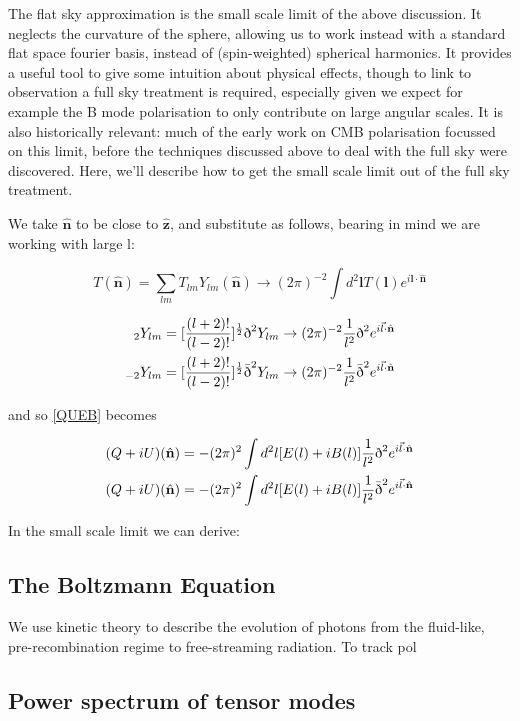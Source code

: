 \documentclass[a4paper,11pt]{article}
\renewcommand{\v}[1]{\mathbf{#1}}
\newcommand{\half}{\frac{1}{2}}
\newcommand{\unit}[1]{\hat{\v{#1}}}
\newcommand{\sr}{\text{\normalfont\dh}}
\renewcommand{\sl}{\bar{\text{\normalfont\dh}}}
\newcommand{\ltwo}{[\frac{(l+2)!}{(l-2)!}]}
\begin{document}
The flat sky approximation is the small scale limit of the above discussion. It neglects the curvature of the sphere, allowing us to work instead with a standard flat space fourier basis, instead of (spin-weighted) spherical harmonics. It provides a useful tool to give some intuition about physical effects, though to link to observation a full sky treatment is required, especially given we expect for example the B mode polarisation to only contribute on large angular scales. It is also historically relevant: much of the early work on CMB polarisation focussed on this limit, before the techniques discussed above to deal with the full sky were discovered. Here, we'll describe how to get the small scale limit out of the full sky treatment.

We take $\unit{n}$ to be close to $\unit{z}$, and substitute as follows, bearing in mind we are working with large l:

\begin{equation}
T(\unit{n}) = \sum_{lm} T_{lm}Y_{lm}(\unit{n}) \rightarrow (2\pi)^{-2} \int d^2\v{l} T(\v{l})e^{i\v{l}\cdot\unit{n}}
\end{equation}

\begin{align}
{}_2Y_{lm} &= \ltwo^\half\sr^2Y_{lm} \rightarrow (2\pi)^{-2} \frac{1}{l^2}\sr^2e^{i\vec{l}\cdot\unit{n}}\\
{}_{-2}Y_{lm} &= \ltwo^\half\sl^2Y_{lm} \rightarrow (2\pi)^{-2} \frac{1}{l^2}\sl^2e^{i\vec{l}\cdot\unit{n}}
\end{align}

and so \ref{QUEB} becomes

\begin{align}
(Q+iU)(\unit{n}) &= -(2\pi)^2\int d^2l [E(l)+iB(l)]  \frac{1}{l^2}\sr^2e^{i\vec{l}\cdot\unit{n}}\\
(Q+iU)(\unit{n}) &= -(2\pi)^2\int d^2l [E(l)+iB(l)] \frac{1}{l^2}\sl^2e^{i\vec{l}\cdot\unit{n}}
\end{align}

In the small scale limit we can derive:

\subsection{The Boltzmann Equation}

We use kinetic theory to describe the evolution of photons from the fluid-like, pre-recombination regime to free-streaming radiation. To track pol


\subsection{Power spectrum of tensor modes}
\end{document}
